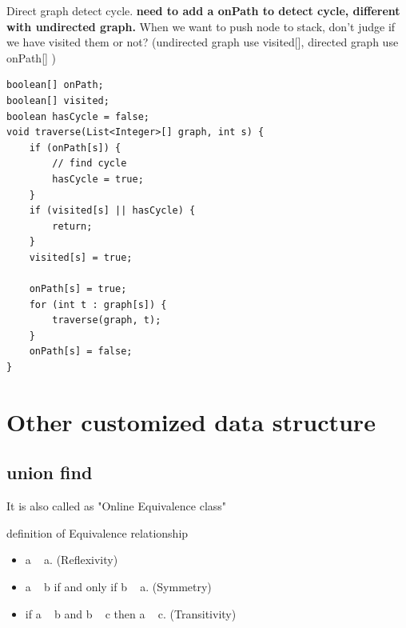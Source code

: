 \documentclass[a4paper,11pt,twoside]{book}
\begin{document}
	\par Direct graph detect cycle. \textbf{need to add a onPath to detect cycle, different with undirected graph.} When we want to push node to stack, don't judge if we have visited them or not?  (undirected graph use visited[], directed graph use onPath[] )
	
\begin{lstlisting}
boolean[] onPath;
boolean[] visited;
boolean hasCycle = false;
void traverse(List<Integer>[] graph, int s) {
	if (onPath[s]) {
		// find cycle
		hasCycle = true;
	}
	if (visited[s] || hasCycle) {
		return;
	}
	visited[s] = true;

	onPath[s] = true;
	for (int t : graph[s]) {
		traverse(graph, t);
	}
	onPath[s] = false;
}
\end{lstlisting}



\section{Other customized data structure}

\subsection{union find}

	\par It is also called as "Online Equivalence class"
	
	\par definition of Equivalence relationship
	\begin{itemize}
		\item a ~ a. (Reflexivity)
		\item a ~ b if and only if b ~ a. (Symmetry)
		\item if a ~ b and b ~ c then a ~ c. (Transitivity)
	\end{itemize}
	
\end{document}
